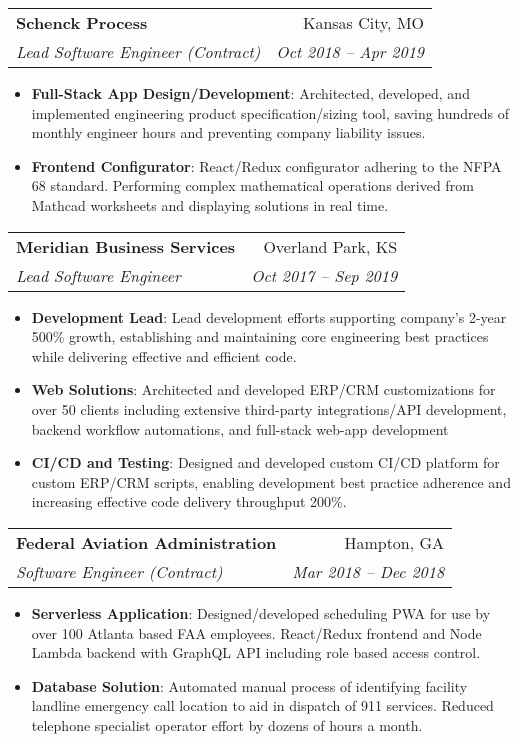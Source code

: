 \documentclass[letterpaper,11pt]{article}
\makeatletter
\newcommand{\resumeItem}[2]{
  \item\small{
    \textbf{#1}{: #2 \vspace{-2pt}}
  }
}
\newcommand{\resumeSubheading}[4]{
  \vspace{-4pt}\item
    \begin{tabular*}{0.97\textwidth}[t]{l@{\extracolsep{\fill}}r}
      \textbf{#1} & #2 \\
      \textit{\small#3} & \textit{\small #4} \\
    \end{tabular*}\vspace{-5pt}
}
\newcommand{\resumeItemListStart}{\begin{itemize}[leftmargin=0.15in]}
\newcommand{\resumeItemListEnd}{\end{itemize}\vspace{-5pt}}
\makeatother
\begin{document}
    \resumeSubheading
      {Schenck Process}{Kansas City, MO}
      {Lead Software Engineer (Contract)}{Oct 2018 -- Apr 2019}
      \resumeItemListStart
        \resumeItem{Full-Stack App Design/Development}
          {Architected, developed, and implemented engineering product specification/sizing tool, saving hundreds of 
          monthly engineer hours and preventing company liability issues.}
        \resumeItem{Frontend Configurator}
          {React/Redux configurator adhering to the NFPA 68 standard. Performing complex mathematical operations derived from Mathcad worksheets 
          and displaying solutions in real time.}
      \resumeItemListEnd

    \resumeSubheading
      {Meridian Business Services}{Overland Park, KS}
      {Lead Software Engineer}{Oct 2017 -- Sep 2019}
      \resumeItemListStart
        \resumeItem{Development Lead}
          {Lead development efforts supporting company's 2-year 500\% growth, 
          establishing and maintaining core engineering best practices while delivering effective and efficient code.}
        \resumeItem{Web Solutions}
          {Architected and developed ERP/CRM customizations for over 50 clients including extensive 
          third-party integrations/API development, backend workflow automations, and full-stack web-app development}
        \resumeItem{CI/CD and Testing}
          {Designed and developed custom CI/CD platform for custom ERP/CRM scripts, enabling development best practice 
          adherence and increasing effective code delivery throughput 200\%.}
      \resumeItemListEnd

    \resumeSubheading
      {Federal Aviation Administration}{Hampton, GA}
      {Software Engineer (Contract)}{Mar 2018 -- Dec 2018}
      \resumeItemListStart
        \resumeItem{Serverless Application}
          {Designed/developed scheduling PWA for use by over 100 Atlanta based FAA employees. 
          React/Redux frontend and Node Lambda backend with GraphQL API including role based access control.}
        \resumeItem{Database Solution}
          {Automated manual process of identifying facility landline emergency call location to aid in dispatch of 911 services. 
          Reduced telephone specialist operator effort by dozens of hours a month.}
      \resumeItemListEnd
\end{document}
